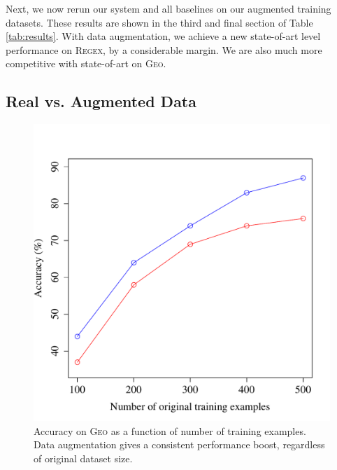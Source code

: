 \documentclass[11pt,letterpaper]{article}
\newcommand{\regex}{\textsc{Regex}\xspace}
\newcommand{\geo}{\textsc{Geo}\xspace}
\begin{document}
Next, we now rerun our system and all baselines on our
augmented training datasets.  These results are shown in the
third and final section of Table \ref{tab:results}.
With data augmentation, we achieve a new state-of-art level performance
on \regex, by a considerable margin.  We are also much more competitive
with state-of-art on \geo.


\subsection{Real vs. Augmented Data}
\begin{figure}[t] 
\small
\begin{center} 
  \includegraphics[scale=0.4]{fig-geo-augment.pdf}
\end{center} 
\caption{Accuracy on \geo as a function of number of training examples.
  Data augmentation gives a consistent performance boost,
regardless of original dataset size.}
\label{fig:geo-augment}
\end{figure}
\end{document}
